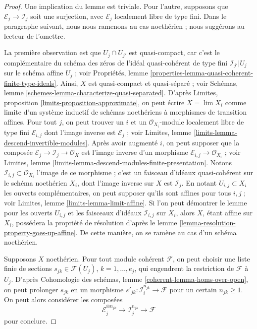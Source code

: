 \begin{proof}
Une implication du lemme est triviale. Pour l'autre,
supposons que $\mathcal{E}_j \to \mathcal{I}_j$ soit une surjection, avec
$\mathcal{E}_j$ localement libre de type fini. Dans le paragraphe suivant, nous
nous ramenons au cas noethérien ; nous suggérons au lecteur de l'omettre.

\medskip\noindent
La première observation est que $U_j \cap U_{j'}$ est quasi-compact,
car c'est le complémentaire du schéma des zéros de l'idéal quasi-cohérent de type fini
$\mathcal{I}_{j'}|{U_j}$ sur le schéma affine $U_j$ ; voir
Propriétés, lemme \ref{properties-lemma-quasi-coherent-finite-type-ideals}.
Ainsi, $X$ est quasi-compact et quasi-séparé ; voir
Schémas, lemme \ref{schemes-lemma-characterize-quasi-separated}.
D'après Limites, proposition \ref{limits-proposition-approximate},
on peut écrire $X = \lim X_i$ comme limite d'un système inductif de
schémas noethériens à morphismes de transition affines. Pour tout $j$,
on peut trouver un $i$ et un $\mathcal{O}_{X_i}$-module localement libre de type fini
$\mathcal{E}_{i, j}$ dont l'image inverse est $\mathcal{E}_j$ ; voir
Limites, lemme \ref{limits-lemma-descend-invertible-modules}.
Après avoir augmenté $i$, on peut supposer que la composée
$\mathcal{E}_j \to \mathcal{I}_j \to \mathcal{O}_X$ est l'image
inverse d'un morphisme $\mathcal{E}_{i, j} \to \mathcal{O}_{X_i}$ ; voir
Limites, lemme \ref{limits-lemma-descend-modules-finite-presentation}.
Notons $\mathcal{I}_{i, j} \subset \mathcal{O}_{X_i}$ l'image
de ce morphisme ; c'est un faisceau d'idéaux quasi-cohérent sur le schéma noethérien
$X_i$, dont l'image inverse sur $X$ est $\mathcal{I}_j$.
En notant $U_{i, j} \subset X_i$ les ouverts complémentaires, on
peut supposer qu'ils sont affines pour tous $i, j$ ; voir
Limites, lemme \ref{limits-lemma-limit-affine}.
Si l'on peut démontrer le lemme pour les ouverts $U_{i, j}$ et les
faisceaux d'idéaux $\mathcal{I}_{i, j}$ sur $X_i$, alors $X$, étant affine
sur $X_i$, possédera la propriété de résolution d'après le
lemme \ref{lemma-resolution-property-goes-up-affine}.
De cette manière, on se ramène au cas d'un schéma noethérien.

\medskip\noindent
Supposons $X$ noethérien. Pour tout module cohérent $\mathcal{F}$,
on peut choisir une liste finie de sections $s_{jk} \in \mathcal{F}(U_j)$,
$k = 1, \ldots, e_j$, qui engendrent la restriction de $\mathcal{F}$ à $U_j$.
D'après Cohomologie des schémas, lemme \ref{coherent-lemma-homs-over-open},
on peut prolonger $s_{jk}$ en un morphisme
$s'_{jk} : \mathcal{I}_i^{n_{jk}} \to \mathcal{F}$ pour un certain $n_{jk} \geq 1$.
On peut alors considérer les composées
$$
\mathcal{E}_j^{\otimes n_{jk}} \to \mathcal{I}_j^{n_{jk}} \to \mathcal{F}
$$
pour conclure.
\end{proof}

